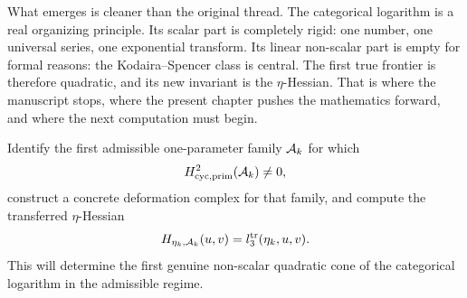 \begin{conclusion}
\label{conc:final-music}
What emerges is cleaner than the original thread.  The categorical logarithm is
a real organizing principle.  Its scalar part is completely rigid: one number,
one universal series, one exponential transform.  Its linear non-scalar part is
empty for formal reasons: the Kodaira--Spencer class is central.  The first true
frontier is therefore quadratic, and its new invariant is the $\eta$-Hessian.
That is where the manuscript stops, where the present chapter pushes the
mathematics forward, and where the next computation must begin.
\end{conclusion}

\begin{openproblem}
\label{op:first-nonsemisimple-admissible-family}
Identify the first admissible one-parameter family $\mathcal{A}_k$ for which
\[
H^2_{\mathrm{cyc,prim}}(\mathcal{A}_k)\neq 0,
\]
construct a concrete deformation complex for that family, and compute the
transferred $\eta$-Hessian
\[
H_{\eta_k,\mathcal{A}_k}(u,v)=l_3^{\mathrm{tr}}(\eta_k,u,v).
\]
This will determine the first genuine non-scalar quadratic cone of the
categorical logarithm in the admissible regime.
\end{openproblem}

